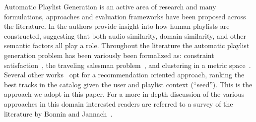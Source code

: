 






%
%

Automatic Playlist Generation is an active area of research and many formulations, approaches and evaluation frameworks have been proposed across the literature. In \cite{Cunningham:06} the authors provide insight into how human playlists are constructed, suggesting that both audio similarity, domain similarity, and other semantic factors all play a role. Throughout the literature the automatic playlist generation problem has been variously been formalized as:  constraint satisfaction~\cite{Pauws2008647}, the traveling salesman problem~\cite{Knees:2006}, and clustering in a metric space~\cite{Pauws:ISMIR02}. Several other works~\cite{Hariri:2012, Jannach:2015,a2mf} opt for a recommendation oriented approach, ranking the best tracks in the catalog given the user and playlist context (``seed''). This is the approach we adopt in this paper. For a more in-depth discussion of the various approaches in this domain interested readers are referred to a survey of the literature by Bonnin and Jannach~\cite{playlist_survey}.

